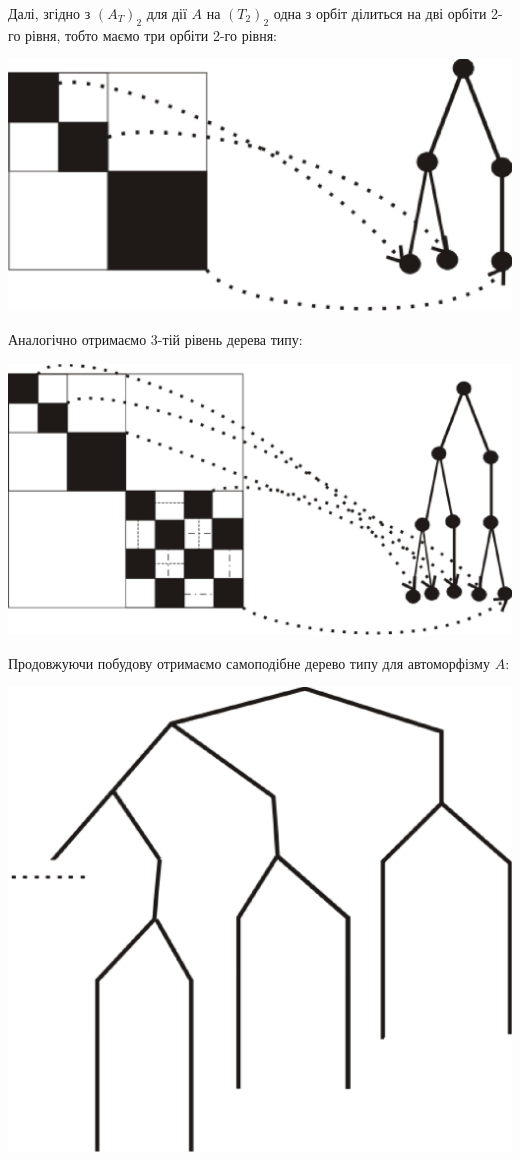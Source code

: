 \documentclass[a4paper,12pt]{article} \usepackage{a4wide}
\numberwithin{equation}{subsection}
\begin{document}
Далі, згідно з $(A_T)_2$ для дії $A$ на $(T_2)_2$  одна з орбіт ділиться на дві орбіти 2-го рівня, тобто маємо три орбіти 2-го рівня:
\begin{center}
\includegraphics[scale=0.6]{buildttst2.eps}
\end{center}
Аналогічно отримаємо 3-тій рівень дерева типу:
\begin{center}
\includegraphics[scale=0.6]{buildttst3.eps}
\end{center}
Продовжуючи побудову  отримаємо самоподібне дерево типу для автоморфізму $A$:
\begin{center}
\includegraphics[scale=0.5]{buildttstf.eps}
\end{center}
\end{document}
